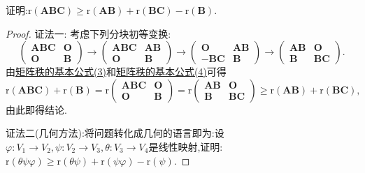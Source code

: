 \documentclass[lang=cn,newtx,10pt,scheme=chinese]{elegantbook}
\begin{document}
\begin{proposition}[Frobenius不等式]\label{proposition:Frobenius不等式}
证明:\(\mathrm{r}(\boldsymbol{A}\boldsymbol{B}\boldsymbol{C})\geq\mathrm{r}(\boldsymbol{A}\boldsymbol{B})+\mathrm{r}(\boldsymbol{B}\boldsymbol{C})-\mathrm{r}(\boldsymbol{B})\).
\end{proposition}
\begin{proof}
    {\color{blue}证法一:}
    考虑下列分块初等变换:
    \[
    \begin{pmatrix}
    \boldsymbol{A}\boldsymbol{B}\boldsymbol{C}&\boldsymbol{O}\\
    \boldsymbol{O}&\boldsymbol{B}
    \end{pmatrix}\to
    \begin{pmatrix}
    \boldsymbol{A}\boldsymbol{B}\boldsymbol{C}&\boldsymbol{A}\boldsymbol{B}\\
    \boldsymbol{O}&\boldsymbol{B}
    \end{pmatrix}\to
    \begin{pmatrix}
    \boldsymbol{O}&\boldsymbol{A}\boldsymbol{B}\\
    -\boldsymbol{B}\boldsymbol{C}&\boldsymbol{B}
    \end{pmatrix}\to
    \begin{pmatrix}
    \boldsymbol{A}\boldsymbol{B}&\boldsymbol{O}\\
    \boldsymbol{B}&\boldsymbol{B}\boldsymbol{C}
    \end{pmatrix}.
    \]
    由\hyperref[矩阵秩的基本公式3]{矩阵秩的基本公式(3)}和\hyperref[矩阵秩的基本公式4]{矩阵秩的基本公式(4)}可得
    \[
    \mathrm{r}(\boldsymbol{A}\boldsymbol{B}\boldsymbol{C})+\mathrm{r}(\boldsymbol{B})=\mathrm{r}\begin{pmatrix}
    \boldsymbol{A}\boldsymbol{B}\boldsymbol{C}&\boldsymbol{O}\\
    \boldsymbol{O}&\boldsymbol{B}
    \end{pmatrix}=\mathrm{r}\begin{pmatrix}
    \boldsymbol{A}\boldsymbol{B}&\boldsymbol{O}\\
    \boldsymbol{B}&\boldsymbol{B}\boldsymbol{C}
    \end{pmatrix}\geq\mathrm{r}(\boldsymbol{A}\boldsymbol{B})+\mathrm{r}(\boldsymbol{B}\boldsymbol{C}),
    \]
    由此即得结论. 

    {\color{blue}证法二(几何方法):}将问题转化成几何的语言即为:设\(\varphi:V_1\to V_2,\psi:V_2\to V_3,\theta:V_3\to V_4\)是线性映射,证明:\(\text{r}(\theta\psi\varphi)\geq\text{r}(\theta\psi)+\text{r}(\psi\varphi)-\text{r}(\psi)\).


\end{proof}
\end{document}
